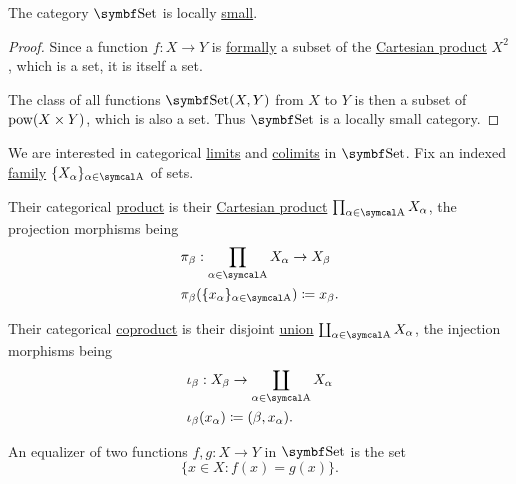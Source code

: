 \begin{proposition}\label{thm:set_is_locally_small}
  The category \( \Cat{Set} \) is locally \hyperref[def:category_cardinality]{small}.
\end{proposition}
\begin{proof}
  Since a function \( f: X \to Y \) is \hyperref[def:function]{formally} a subset of the \hyperref[def:cartesian_product]{Cartesian product} \( X^2 \), which is a set, it is itself a set.

  The class of all functions \( \Cat{Set}(X, Y) \) from \( X \) to \( Y \) is then a subset of \( \operatorname{pow}(X \times Y) \), which is also a set. Thus \( \Cat{Set} \) is a locally small category.
\end{proof}

\begin{proposition}\label{thm:set_categorical_limits}
  We are interested in categorical \hyperref[def:categorical_limit]{limits} and \hyperref[def:categorical_colimit]{colimits} in \( \Cat{Set} \). Fix an indexed \hyperref[def:indexed_family]{family} \( \{ X_\al \}_{\al \in \CA} \) of sets.
  \begin{defenum}
     Their categorical \hyperref[def:categorical_product]{product} is their \hyperref[def:cartesian_product]{Cartesian product} \( \prod_{\al \in \CA} X_\al \), the projection morphisms being
    \begin{align*}
      &\pi_\beta: \prod_{\al \in \CA} X_\al \to X_\beta \\
      &\pi_\beta(\{ x_\al \}_{\al \in \CA}) \coloneqq x_\beta.
    \end{align*}

     Their categorical \hyperref[def:categorical_coproduct]{coproduct} is their disjoint \hyperref[def:disjoint_union]{union} \( \coprod_{\al \in \CA} X_\al \), the injection morphisms being
    \begin{align*}
      &\iota_\beta: X_\beta \to \coprod_{\al \in \CA} X_\al \\
      &\iota_\beta(x_\al) \coloneqq (\beta, x_\al).
    \end{align*}

     An equalizer of two functions \( f, g: X \to Y \) in \( \Cat{Set} \) is the set
    \begin{equation*}
      \{ x \in X \colon f(x) = g(x) \}.
    \end{equation*}


\end{defenum}
\end{proposition}
